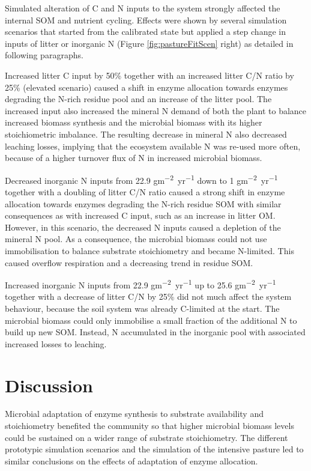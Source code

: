 Simulated alteration of C and N inputs to the system strongly affected the
internal SOM and nutrient cycling. Effects were shown by several
simulation scenarios that started from the calibrated state but applied a step change in
inputs of litter or inorganic N (Figure \ref{fig:pastureFitScen} right) as detailed
in following paragraphs.

Increased litter C input by 50\% together with an increased litter C/N
ratio by 25\% (elevated  scenario) caused a shift in enzyme
allocation towards enzymes degrading the N-rich residue pool and an increase of
the litter pool. The increased input also increased the mineral N demand of both the plant
to balance increased biomass synthesis and the microbial biomass with its higher
stoichiometric imbalance. The resulting decrease in mineral N also decreased
leaching losses, implying that the ecosystem available N was re-used more often, because of a higher
turnover flux of N in increased microbial biomass.

Decreased inorganic N inputs from 22.9
\unit{gm^{-2}yr^{-1}} down to 1
\unit{gm^{-2}yr^{-1}} together with a doubling of litter C/N
ratio caused a strong shift in enzyme allocation towards enzymes degrading the
N-rich residue SOM with similar consequences as with increased C input,
such as an increase in litter OM. However, in this scenario, the decreased N inputs caused
a depletion of the mineral N pool.
As a consequence, the microbial biomass could not use immobilisation to
balance substrate stoichiometry and became N-limited.
This caused overflow respiration and a decreasing trend in residue SOM.

Increased inorganic N inputs from 22.9 \unit{gm^{-2}yr^{-1}} up to 25.6
\unit{gm^{-2}yr^{-1}} together with a decrease of litter C/N by 25\% did not
much affect the system behaviour, because the soil system was already C-limited
at the start. The microbial biomass could only immobilise a small fraction of the additional N to build 
up new SOM. Instead, N accumulated in the inorganic pool with associated
increased losses to leaching.

\section{Discussion}
Microbial adaptation of enzyme synthesis to substrate availability and
stoichiometry benefited the community so that higher microbial biomass levels
could be sustained on a wider range of substrate stoichiometry.
The different prototypic simulation scenarios and the simulation of the
intensive pasture led to similar conclusions on the effects of adaptation of
enzyme allocation.

